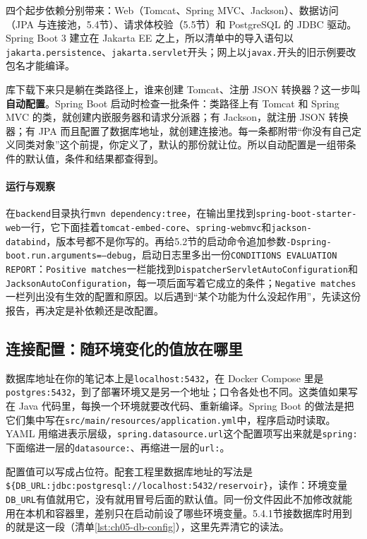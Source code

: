 四个起步依赖分别带来：Web（Tomcat、Spring MVC、Jackson）、数据访问（JPA 与连接池，5.4节）、请求体校验（5.5节）和 PostgreSQL 的 JDBC 驱动。Spring Boot 3 建立在 Jakarta EE 之上，所以清单中的导入语句以\texttt{jakarta.persistence}、\texttt{jakarta.servlet}开头；网上以\texttt{javax.}开头的旧示例要改包名才能编译。

库下载下来只是躺在类路径上，谁来创建 Tomcat、注册 JSON 转换器？这一步叫\textbf{自动配置}。Spring Boot 启动时检查一批条件：类路径上有 Tomcat 和 Spring MVC 的类，就创建内嵌服务器和请求分派器；有 Jackson，就注册 JSON 转换器；有 JPA 而且配置了数据库地址，就创建连接池。每一条都附带“你没有自己定义同类对象”这个前提，你定义了，默认的那份就让位。所以自动配置是一组带条件的默认值，条件和结果都查得到。

\paragraph{运行与观察}在\texttt{backend}目录执行\texttt{mvn dependency:tree}，在输出里找到\texttt{spring-boot-starter-web}一行，它下面挂着\texttt{tomcat-embed-core}、\texttt{spring-webmvc}和\texttt{jackson-databind}，版本号都不是你写的。再给5.2节的启动命令追加参数\texttt{-Dspring-boot.run.arguments=--debug}，启动日志里多出一份\texttt{CONDITIONS EVALUATION REPORT}：\texttt{Positive matches}一栏能找到\texttt{DispatcherServletAutoConfiguration}和\texttt{JacksonAutoConfiguration}，每一项后面写着它成立的条件；\texttt{Negative matches}一栏列出没有生效的配置和原因。以后遇到“某个功能为什么没起作用”，先读这份报告，再决定是补依赖还是改配置。

\subsection{连接配置：随环境变化的值放在哪里}

数据库地址在你的笔记本上是\texttt{localhost:5432}，在 Docker Compose 里是\texttt{postgres:5432}，到了部署环境又是另一个地址；口令各处也不同。这类值如果写在 Java 代码里，每换一个环境就要改代码、重新编译。Spring Boot 的做法是把它们集中写在\texttt{src/main/resources/application.yml}中，程序启动时读取。YAML 用缩进表示层级，\texttt{spring.datasource.url}这个配置项写出来就是\texttt{spring:}下面缩进一层的\texttt{datasource:}、再缩进一层的\texttt{url:}。

配置值可以写成占位符。配套工程里数据库地址的写法是\texttt{\$\{DB\_URL:}\allowbreak\texttt{jdbc:postgresql://}\allowbreak\texttt{localhost:5432/reservoir\}}，读作：环境变量\texttt{DB\_URL}有值就用它，没有就用冒号后面的默认值。同一份文件因此不加修改就能用在本机和容器里，差别只在启动前设了哪些环境变量。5.4.1节接数据库时用到的就是这一段（清单\ref{lst:ch05-db-config}），这里先弄清它的读法。

